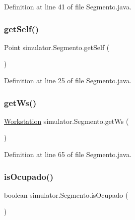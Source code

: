 Definition at line 41 of file Segmento.\+java.

\mbox{\label{classsimulator_1_1_segmento_a64e246e93f409c3a97798e6b9e63ab42}} 
\subsubsection{\texorpdfstring{get\+Self()}{getSelf()}}
{\footnotesize\ttfamily Point simulator.\+Segmento.\+get\+Self (\begin{DoxyParamCaption}{ }\end{DoxyParamCaption})}



Definition at line 25 of file Segmento.\+java.

\mbox{\label{classsimulator_1_1_segmento_aacd44ec934de39929837f8f3818e2e3b}} 
\subsubsection{\texorpdfstring{get\+Ws()}{getWs()}}
{\footnotesize\ttfamily \mbox{\hyperlink{classsimulator_1_1_workstation}{Workstation}} simulator.\+Segmento.\+get\+Ws (\begin{DoxyParamCaption}{ }\end{DoxyParamCaption})}



Definition at line 65 of file Segmento.\+java.

\mbox{\label{classsimulator_1_1_segmento_a0da0a40fad9f388e76ce57b6ce072430}} 
\subsubsection{\texorpdfstring{is\+Ocupado()}{isOcupado()}}
{\footnotesize\ttfamily boolean simulator.\+Segmento.\+is\+Ocupado (\begin{DoxyParamCaption}{ }\end{DoxyParamCaption})}



